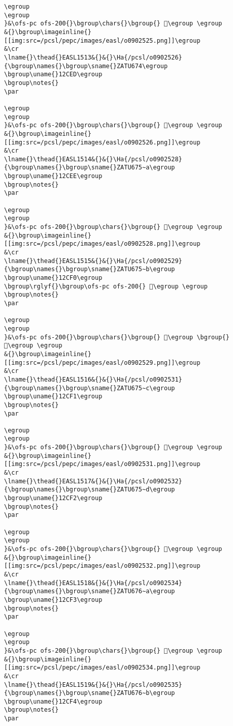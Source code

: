 \begin{verbatim}
\egroup
\egroup
}&\ofs-pc ofs-200{}\bgroup\chars{}\bgroup{} 𒳬\egroup \egroup
&{}\bgroup\imageinline{}[[img:src=/pcsl/pepc/images/easl/o0902525.png]]\egroup
&\cr
\lname{}\thead{}EASL1513&{}&{}\Ha{/pcsl/o0902526}{\bgroup\names{}\bgroup\sname{}ZATU674\egroup
\bgroup\uname{}12CED\egroup
\bgroup\notes{}
\par 

\egroup
\egroup
}&\ofs-pc ofs-200{}\bgroup\chars{}\bgroup{} 𒳭\egroup \egroup
&{}\bgroup\imageinline{}[[img:src=/pcsl/pepc/images/easl/o0902526.png]]\egroup
&\cr
\lname{}\thead{}EASL1514&{}&{}\Ha{/pcsl/o0902528}{\bgroup\names{}\bgroup\sname{}ZATU675∼a\egroup
\bgroup\uname{}12CEE\egroup
\bgroup\notes{}
\par 

\egroup
\egroup
}&\ofs-pc ofs-200{}\bgroup\chars{}\bgroup{} 𒳮\egroup \egroup
&{}\bgroup\imageinline{}[[img:src=/pcsl/pepc/images/easl/o0902528.png]]\egroup
&\cr
\lname{}\thead{}EASL1515&{}&{}\Ha{/pcsl/o0902529}{\bgroup\names{}\bgroup\sname{}ZATU675∼b\egroup
\bgroup\uname{}12CF0\egroup
\bgroup\rglyf{}\bgroup\ofs-pc ofs-200{} 𒳰\egroup \egroup
\bgroup\notes{}
\par 

\egroup
\egroup
}&\ofs-pc ofs-200{}\bgroup\chars{}\bgroup{} 𒳯\egroup \bgroup{} 𒳰\egroup \egroup
&{}\bgroup\imageinline{}[[img:src=/pcsl/pepc/images/easl/o0902529.png]]\egroup
&\cr
\lname{}\thead{}EASL1516&{}&{}\Ha{/pcsl/o0902531}{\bgroup\names{}\bgroup\sname{}ZATU675∼c\egroup
\bgroup\uname{}12CF1\egroup
\bgroup\notes{}
\par 

\egroup
\egroup
}&\ofs-pc ofs-200{}\bgroup\chars{}\bgroup{} 𒳱\egroup \egroup
&{}\bgroup\imageinline{}[[img:src=/pcsl/pepc/images/easl/o0902531.png]]\egroup
&\cr
\lname{}\thead{}EASL1517&{}&{}\Ha{/pcsl/o0902532}{\bgroup\names{}\bgroup\sname{}ZATU675∼d\egroup
\bgroup\uname{}12CF2\egroup
\bgroup\notes{}
\par 

\egroup
\egroup
}&\ofs-pc ofs-200{}\bgroup\chars{}\bgroup{} 𒳲\egroup \egroup
&{}\bgroup\imageinline{}[[img:src=/pcsl/pepc/images/easl/o0902532.png]]\egroup
&\cr
\lname{}\thead{}EASL1518&{}&{}\Ha{/pcsl/o0902534}{\bgroup\names{}\bgroup\sname{}ZATU676∼a\egroup
\bgroup\uname{}12CF3\egroup
\bgroup\notes{}
\par 

\egroup
\egroup
}&\ofs-pc ofs-200{}\bgroup\chars{}\bgroup{} 𒳳\egroup \egroup
&{}\bgroup\imageinline{}[[img:src=/pcsl/pepc/images/easl/o0902534.png]]\egroup
&\cr
\lname{}\thead{}EASL1519&{}&{}\Ha{/pcsl/o0902535}{\bgroup\names{}\bgroup\sname{}ZATU676∼b\egroup
\bgroup\uname{}12CF4\egroup
\bgroup\notes{}
\par 


\end{verbatim}
